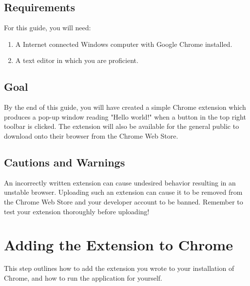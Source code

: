 \documentclass[11pt]{article}
\begin{document}
\subsection{Requirements}

For this guide, you will need:

\begin{enumerate}
	\item A Internet connected Windows computer with Google Chrome installed.
	\item A text editor in which you are proficient.
\end{enumerate}

\subsection{Goal}

By the end of this guide, you will have created a simple Chrome extension which produces a pop-up window reading "Hello world!" when a button in the top right toolbar is clicked. The extension will also be available for the general public to download onto their browser from the Chrome Web Store.

\subsection{Cautions and Warnings}

An incorrectly written extension can cause undesired behavior resulting in an unstable browser. Uploading such an extension can cause it to be removed from the Chrome Web Store and your developer account to be banned. Remember to test your extension thoroughly before uploading!

\newpage

\section{Adding the Extension to Chrome}

This step outlines how to add the extension you wrote to your installation of Chrome, and how to run the application for yourself.
\end{document}
